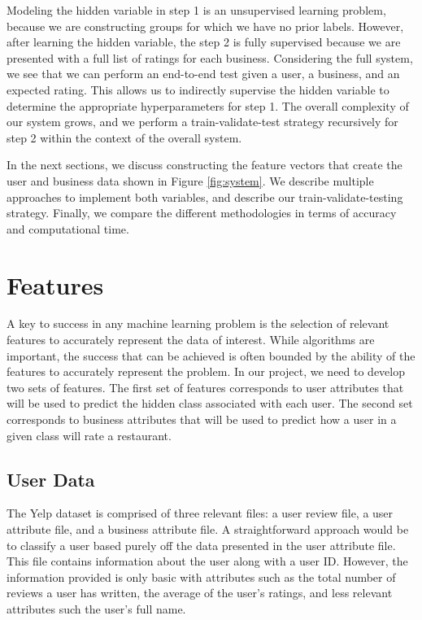 \documentclass[11pt]{article}
\begin{document}
Modeling the hidden variable in step 1 is an unsupervised learning problem, because we are constructing groups for which we have no prior labels. However, after learning the hidden variable, the step 2 is fully supervised because we are presented with a full list of ratings for each business. Considering the full system, we see that we can perform an end-to-end test given a user, a business, and an expected rating. This allows us to indirectly supervise the hidden variable to determine the appropriate hyperparameters for step 1. The overall complexity of our system grows, and we perform a train-validate-test strategy recursively for step 2 within the context of the overall system.

In the next sections, we discuss constructing the feature vectors that create the user and business data shown in Figure \ref{fig:system}. We describe multiple approaches to implement both variables, and describe our train-validate-testing strategy. Finally, we compare the different methodologies in terms of accuracy and computational time.

\section{Features}

A key to success in any machine learning problem is the selection of relevant features to accurately represent the data of interest. While algorithms are important, the success that can be achieved is often bounded by the ability of the features to accurately represent the problem. In our project, we need to develop two sets of features. The first set of features corresponds to user attributes that will be used to predict the hidden class associated with each user. The second set corresponds to business attributes that will be used to predict how a user in a given class will rate a restaurant.

\subsection{User Data}
The Yelp dataset is comprised of three relevant files: a user review file, a user attribute file, and a business attribute file. A straightforward approach would be to classify a user based purely off the data presented in the user attribute file. This file contains information about the user along with a user ID. However, the information provided is only basic with attributes such as the total number of reviews a user has written, the average of the user's ratings, and less relevant attributes such the user's full name.
\end{document}

